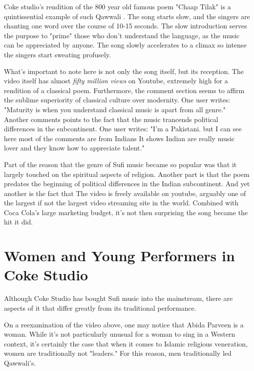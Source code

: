 \documentclass{article}
\begin{document}
  Coke studio's rendition of the 800 year old famous poem "Chaap Tilak" is a
  quintissential example of such Qawwali \autocite{Chaaptilaak}. The song starts
  slow, and the singers are chanting one word over the course of 10-15 seconds.
  The slow introduction serves the purpose to "prime" those who don't understand
  the language, as the music can be appreciated by anyone. The song slowly
  accelerates to a climax so intense the singers start sweating profusely. 

  What's important to note here is not only the song itself, but its reception. 
  The video itself has almost \textit{fifty million views} on Youtube, extremely
  high for a rendition of a classical poem. Furthermore, the comment section
  seems to affirm the sublime superiority of classical culture over modernity.
  One user writes: "Maturity is when you understand classical music is apart
  from all genre." Another comments points to the fact that the music trancends political
  differences in the subcontinent. One user writes: "I'm a Pakistani. but I can
  see here most of the comments are from Indians It shows Indian are really
  music lover and they know how to appreciate talent." 

  Part of the reason that the genre of Sufi music became so popular was that it
  largely touched on the spiritual aspects of religion. Another part is that the
  poem predates the beginning of political differences in the Indian
  subcontinent. And yet another is the fact that The video is freely available
  on youtube, arguably one of the largest if not the largest video streaming
  site in the world. Combined with Coca Cola's large marketing budget, it's not then 
  surprising the song became the hit it did. 

  \section{Women and Young Performers in Coke Studio}

  Although Coke Studio has bought Sufi music into the mainstream, there are aspects
  of it that differ greatly from its traditional performance. 

  On a reexamination of the video above, one may notice that Abida Parveen is a woman. 
  While it's not particularly unusual for a woman to sing in a Western context, it's 
  certainly the case that when it comes to Islamic religious veneration, women are 
  traditionally not "leaders." For this reason, men traditionally led Qawwali's.
\end{document}
